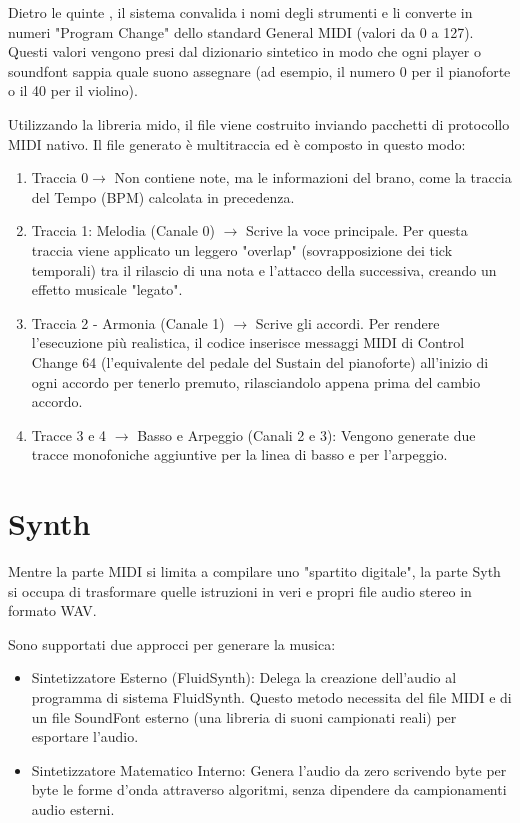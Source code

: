 Dietro le quinte , il sistema convalida i nomi degli strumenti e li converte in numeri "Program Change" dello standard General MIDI (valori da 0 a 127). Questi valori vengono presi dal dizionario sintetico in modo che ogni player o soundfont sappia quale suono assegnare (ad esempio, il numero 0 per il pianoforte o il 40 per il violino).

Utilizzando la libreria mido, il file viene costruito inviando pacchetti di protocollo MIDI nativo. Il file generato è multitraccia ed è composto in questo modo:
\begin{enumerate}
    \item Traccia 0$\rightarrow$ Non contiene note, ma le informazioni del brano, come la traccia del Tempo (BPM) calcolata in precedenza.
    \item Traccia 1: Melodia (Canale 0) $\rightarrow$ Scrive la voce principale. Per questa traccia viene applicato un leggero "overlap" (sovrapposizione dei tick temporali) tra il rilascio di una nota e l'attacco della successiva, creando un effetto musicale "legato".
    \item Traccia 2 - Armonia (Canale 1) $\rightarrow$ Scrive gli accordi. Per rendere l'esecuzione più realistica, il codice inserisce messaggi MIDI di Control Change 64 (l'equivalente del pedale del Sustain del pianoforte) all'inizio di ogni accordo per tenerlo premuto, rilasciandolo appena prima del cambio accordo.
    \item Tracce 3 e 4 $\rightarrow$  Basso e Arpeggio (Canali 2 e 3): Vengono generate due tracce monofoniche aggiuntive per la linea di basso e per l'arpeggio.
\end{enumerate}

\section{Synth}
Mentre la parte MIDI si limita a compilare uno "spartito digitale", la parte Syth si occupa di trasformare quelle istruzioni in veri e propri file audio stereo in formato WAV.


Sono supportati due approcci per generare la musica:
\begin{itemize}
    \item Sintetizzatore Esterno (FluidSynth): Delega la creazione dell'audio al programma di sistema FluidSynth. Questo metodo necessita del file MIDI e di un file SoundFont esterno (una libreria di suoni campionati reali) per esportare l'audio.
    \item Sintetizzatore Matematico Interno: Genera l'audio da zero scrivendo byte per byte le forme d'onda attraverso algoritmi, senza dipendere da campionamenti audio esterni.
\end{itemize}

